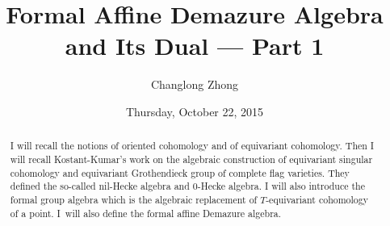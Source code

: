 \documentclass{UAmathtalk}
\author{Changlong Zhong}
\title{Formal Affine Demazure Algebra\\ and Its Dual --- Part 1}
\date{Thursday, October 22, 2015}
\begin{document}
\maketitle

\begin{abstract}
I will recall the notions of oriented cohomology and of equivariant cohomology. Then I will recall Kostant-Kumar's work on the algebraic construction of equivariant singular cohomology and equivariant Grothen\-dieck group of complete flag varieties.
They defined the so-called nil-Hecke algebra and $0$-Hecke algebra.
I will also introduce the formal group algebra which is the algebraic replacement of $T$-equivariant cohomology of a point.
I~will also define the formal affine Demazure algebra.
\end{abstract}
\end{document}
